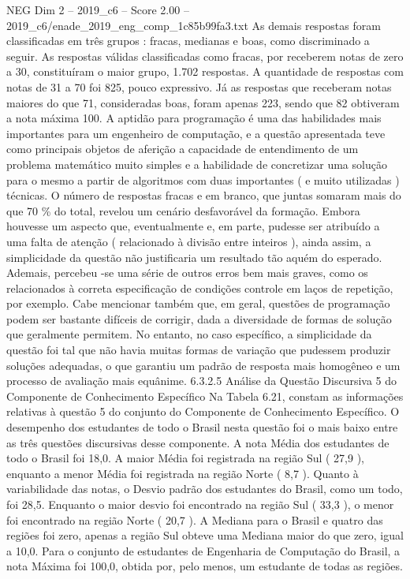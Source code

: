 \begin{textsample}{NEG Dim 2 – 2019\_c6 – Score 2.00 – 2019\_c6/enade\_2019\_eng\_comp\_1c85b99fa3.txt}
As demais respostas foram classificadas em três grupos : fracas, medianas e boas, como discriminado a seguir.
As respostas válidas classificadas como fracas, por receberem notas de zero a 30, constituíram o maior grupo, 1.702 respostas.
A quantidade de respostas com notas de 31 a 70 foi 825, pouco expressivo.
Já as respostas que receberam notas maiores do que 71, consideradas boas, foram apenas 223, sendo que 82 obtiveram a nota máxima 100.
A aptidão para programação é uma das habilidades mais importantes para um engenheiro de computação, e a questão apresentada teve como principais objetos de aferição a capacidade de entendimento de um problema matemático muito simples e a habilidade de concretizar uma solução para o mesmo a partir de algoritmos com duas importantes ( e muito utilizadas ) técnicas.
O número de respostas fracas e em branco, que juntas somaram mais do que 70 \% do total, revelou um cenário desfavorável da formação.
Embora houvesse um aspecto que, eventualmente e, em parte, pudesse ser atribuído a uma falta de atenção ( relacionado à divisão entre inteiros ), ainda assim, a simplicidade da questão não justificaria um resultado tão aquém do esperado.
Ademais, percebeu -se uma série de outros erros bem mais graves, como os relacionados à correta especificação de condições controle em laços de repetição, por exemplo.
Cabe mencionar também que, em geral, questões de programação podem ser bastante difíceis de corrigir, dada a diversidade de formas de solução que geralmente permitem.
No entanto, no caso específico, a simplicidade da questão foi tal que não havia muitas formas de variação que pudessem produzir soluções adequadas, o que garantiu um padrão de resposta mais homogêneo e um processo de avaliação mais equânime. 6.3.2.5 Análise da Questão Discursiva 5 do Componente de Conhecimento Específico Na Tabela 6.21, constam as informações relativas à questão 5 do conjunto do Componente de Conhecimento Específico.
O desempenho dos estudantes de todo o Brasil nesta questão foi o mais baixo entre as três questões discursivas desse componente.
A nota Média dos estudantes de todo o Brasil foi 18,0.
A maior Média foi registrada na região Sul ( 27,9 ), enquanto a menor Média foi registrada na região Norte ( 8,7 ).
Quanto à variabilidade das notas, o Desvio padrão dos estudantes do Brasil, como um todo, foi 28,5.
Enquanto o maior desvio foi encontrado na região Sul ( 33,3 ), o menor foi encontrado na região Norte ( 20,7 ).
A Mediana para o Brasil e quatro das regiões foi zero, apenas a região Sul obteve uma Mediana maior do que zero, igual a 10,0.
Para o conjunto de estudantes de Engenharia de Computação do Brasil, a nota Máxima foi 100,0, obtida por, pelo menos, um estudante de todas as regiões.

\end{textsample}
